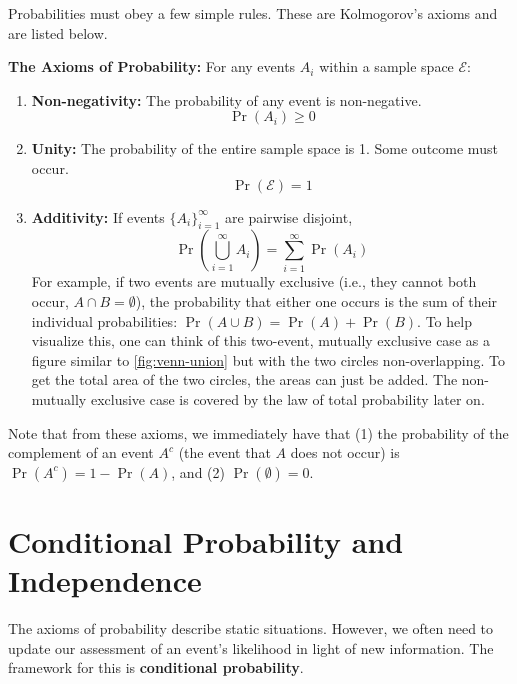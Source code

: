 Probabilities must obey a few simple rules. These are Kolmogorov's axioms and are listed below.
\begin{definitionBox}
    \textbf{The Axioms of Probability:}
    For any events $A_i$ within a sample space $\mathcal{E}$:
    \begin{enumerate}
        \item \textbf{Non-negativity:} The probability of any event is non-negative.
        \begin{equation}
            \Pr(A_i) \ge 0
        \end{equation}
        \item \textbf{Unity:} The probability of the entire sample space is 1. Some outcome must occur.
        \begin{equation}
            \Pr(\mathcal{E}) = 1
        \end{equation}
        \item \textbf{Additivity:} If events $\{A_i\}_{i=1}^\infty$ are pairwise disjoint,
        \begin{equation}
          \Pr\!\left(\bigcup_{i=1}^\infty A_i\right)=\sum_{i=1}^\infty \Pr(A_i)
          \label{eq:probability-additivity-axiom}
        \end{equation}
        For example, if two events are mutually exclusive (i.e., they cannot both occur, $A \cap B = \emptyset$), the probability that either one occurs is  the sum of their individual probabilities: $\Pr(A \cup B) = \Pr(A) + \Pr(B)$. To help visualize this, one can think of this two-event, mutually exclusive case as a figure similar to \autoref{fig:venn-union} but with the two circles non-overlapping. To get the total area of the two circles, the areas can just be added. The non-mutually exclusive case is covered by the law of total probability later on.
    \end{enumerate}
\end{definitionBox}
Note that from these axioms, we immediately have that (1) the probability of the complement of an event $A^{c}$ (the event that $A$ does not occur) is $\Pr(A^{c}) = 1 - \Pr(A)$, and (2) $\Pr(\emptyset) = 0$.
    

\section{Conditional Probability and Independence}
The axioms of probability describe static situations. However, we often need to update our assessment of an event's likelihood in light of new information. The framework for this is \textbf{conditional probability}.

